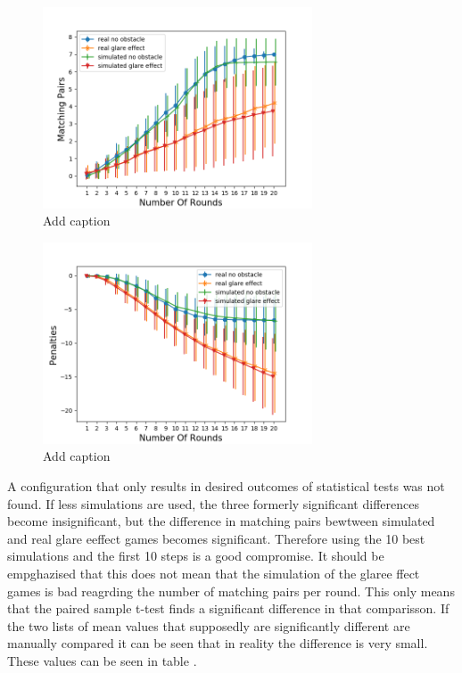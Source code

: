 \begin{minipage}{0.5\textwidth}
	\begin{figure}[H]
		\centering
		\includegraphics[width=8cm]{images/sd10x/Figure_3.png}
		\caption[Bild kurz]{Add caption}
		\label{fig:simOp101}
	\end{figure}
\end{minipage}
\begin{minipage}{0.5\textwidth}
	\begin{figure}[H]
		\centering
		\includegraphics[width=8cm]{images/sd10x/Figure_4.png}
		\caption[Bild kurz]{Add caption}
		\label{fig:simOp102}
	\end{figure}
\end{minipage} 

A configuration that only results in desired outcomes of statistical tests was not found. If less simulations are used, the three formerly significant differences become insignificant, but the difference in matching pairs bewtween simulated and real glare eeffect games becomes significant. Therefore using the 10 best simulations and the first 10 steps is a good compromise. It should be empghazised that this does not mean that the simulation of the glaree ffect games is bad reagrding the number of matching pairs per round. This only means that the paired sample t-test finds a significant difference in that comparisson. If the two lists of mean values that supposedly are significantly different are manually compared it can be seen that in reality the difference is very small. These values can be seen in table .

